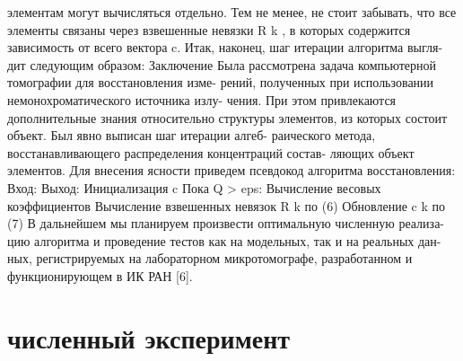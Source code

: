 элементам могут вычисляться отдельно. Тем не менее, не стоит забывать, что
все элементы связаны через взвешенные невязки R k , в которых содержится
зависимость от всего вектора c. Итак, наконец, шаг итерации алгоритма выгля-
дит следующим образом:
Заключение
Была рассмотрена задача компьютерной томографии для восстановления изме-
рений, полученных при использовании немонохроматического источника излу-
чения. При этом привлекаются дополнительные знания относительно структуры
элементов, из которых состоит объект. Был явно выписан шаг итерации алгеб-
раического метода, восстанавливающего распределения концентраций состав-
ляющих объект элементов.
Для внесения ясности приведем псевдокод алгоритма восстановления:
Вход: %
Выход: %
Инициализация c
Пока Q > eps:
Вычисление весовых коэффициентов %
Вычисление взвешенных невязок R k по (6)
Обновление c k по (7)
В дальнейшем мы планируем произвести оптимальную численную реализа-
цию алгоритма и проведение тестов как на модельных, так и на реальных дан-
ных, регистрируемых на лабораторном микротомографе, разработанном и
функционирующем в ИК РАН [6].

\section{численный эксперимент } \label{sect_3_2}
